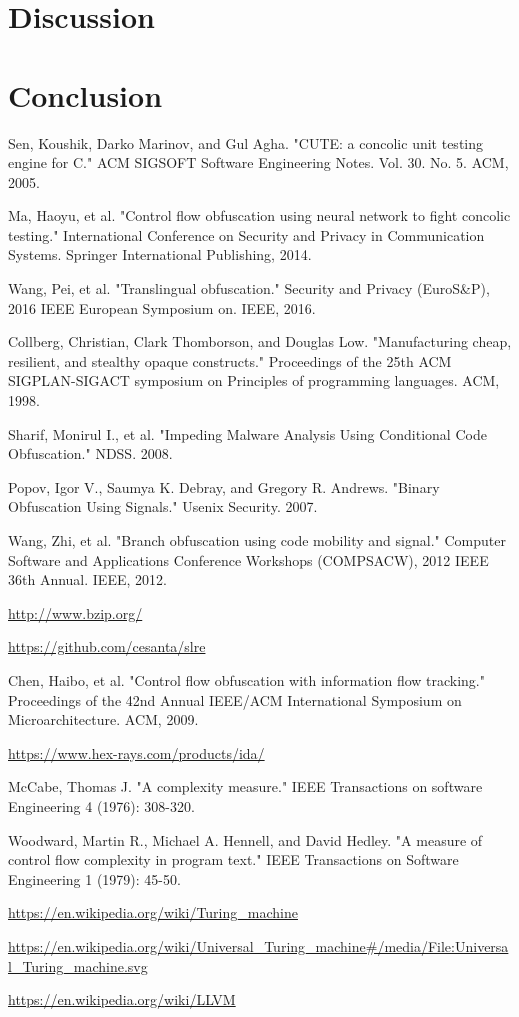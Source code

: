 \documentclass[lnicst]{svmultln}
\begin{document}
\section{Discussion}
\section{Conclusion}

%
%
\begin{thebibliography}{5}

 Sen, Koushik, Darko Marinov, and Gul Agha. "CUTE: a concolic unit testing engine for C." ACM SIGSOFT Software Engineering Notes. Vol. 30. No. 5. ACM, 2005.

 Ma, Haoyu, et al. "Control flow obfuscation using neural network to fight concolic testing." International Conference on Security and Privacy in Communication Systems. Springer International Publishing, 2014.

 Wang, Pei, et al. "Translingual obfuscation." Security and Privacy (EuroS\&P), 2016 IEEE European Symposium on. IEEE, 2016.

 Collberg, Christian, Clark Thomborson, and Douglas Low. "Manufacturing cheap, resilient, and stealthy opaque constructs." Proceedings of the 25th ACM SIGPLAN-SIGACT symposium on Principles of programming languages. ACM, 1998.

 Sharif, Monirul I., et al. "Impeding Malware Analysis Using Conditional Code Obfuscation." NDSS. 2008.

 Popov, Igor V., Saumya K. Debray, and Gregory R. Andrews. "Binary Obfuscation Using Signals." Usenix Security. 2007.

 Wang, Zhi, et al. "Branch obfuscation using code mobility and signal." Computer Software and Applications Conference Workshops (COMPSACW), 2012 IEEE 36th Annual. IEEE, 2012.

 \url{http://www.bzip.org/}

 \url{https://github.com/cesanta/slre}

 Chen, Haibo, et al. "Control flow obfuscation with information flow tracking." Proceedings of the 42nd Annual IEEE/ACM International Symposium on Microarchitecture. ACM, 2009.

 \url{https://www.hex-rays.com/products/ida/}

 McCabe, Thomas J. "A complexity measure." IEEE Transactions on software Engineering 4 (1976): 308-320.

 Woodward, Martin R., Michael A. Hennell, and David Hedley. "A measure of control flow complexity in program text." IEEE Transactions on Software Engineering 1 (1979): 45-50.

 \url{https://en.wikipedia.org/wiki/Turing_machine}

 \url{https://en.wikipedia.org/wiki/Universal_Turing_machine#/media/File:Universal_Turing_machine.svg}

 \url{https://en.wikipedia.org/wiki/LLVM}


\end{thebibliography}
%
\end{document}

